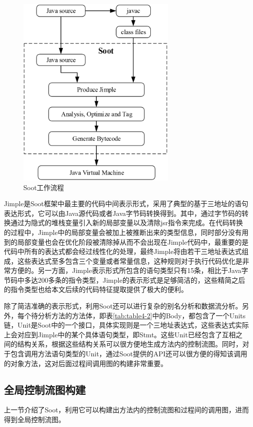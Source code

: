 \begin{figure}
	\centering
	\includegraphics[width=0.70\textwidth]{figures/Soot4-4}
	\caption{Soot工作流程}\label{fig:figure4-4}
\end{figure}

Jimple是Soot框架中最主要的代码中间表示形式，采用了典型的基于三地址的语句表达形式，它可以由Java源代码或者Java字节码转换得到。其中，通过字节码的转换通过为隐式的堆栈变量引入新的局部变量以及清除jsr指令来完成。在代码转换的过程中，Jimple中的局部变量会被加上被推断出来的类型信息，同时部分没有用到的局部变量也会在优化阶段被清除掉从而不会出现在Jimple代码中，最重要的是代码中所有的表达式都会经过线性化的处理，最终Jimple将由若干三地址表达式组成，这些表达式至多包含三个变量或者常量信息，这种规则对于执行代码优化是非常方便的。另一方面，Jimple表示形式所包含的语句类型只有15条，相比于Java字节码中多达200多条的指令类型，Jimple的表示形式是足够简洁的，这些精简之后的指令类型也给本文后续的代码特征提取提供了极大的便利。

除了简洁准确的表示形式，利用Soot还可以进行复杂的别名分析和数据流分析。另外，每个待分析方法的方法体，即表\ref{tab:table4-2}中的Body，都包含了一个Units链，Unit是Soot中的一个接口，具体实现则是一个三地址表达式，这些表达式实际上会对应到Jimple中的某个具体语句类型，即Stmt。这些Unit已经包含了互相之间的结构关系，根据这些结构关系可以很方便地生成方法内的控制流图。同时，对于包含调用方法语句类型的Unit，通过Soot提供的API还可以很方便的得知该调用的对象方法，这对后面过程间调用图的构建非常重要。

\subsection{全局控制流图构建}
上一节介绍了Soot，利用它可以构建出方法内的控制流图和过程间的调用图，进而得到全局控制流图。

